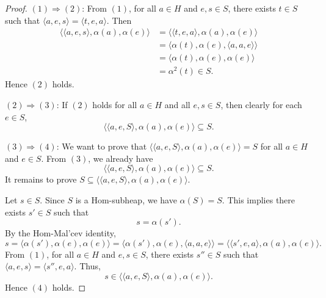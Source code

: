 \documentclass[14pt]{article}
\theoremstyle{Definition}
\theoremstyle{remark}
\begin{document}
\begin{proof}
$(1) \Rightarrow (2)$:  
From $(1)$, for all $a \in H$ and $e, s \in S$, there exists $t \in S$ such that $\langle a, e, s \rangle = \langle t, e, a \rangle$. Then
\begin{align*}
\langle \langle a, e, s \rangle, \alpha(a), \alpha(e) \rangle
&= \langle \langle t, e, a \rangle, \alpha(a), \alpha(e) \rangle \\
&= \langle \alpha(t), \alpha(e), \langle a, a, e \rangle \rangle \\
&= \langle \alpha(t), \alpha(e), \alpha(e) \rangle \\
&= \alpha^{2}(t) \in S.
\end{align*}
Hence $(2)$ holds.

\vspace{0.3em}
$(2) \Rightarrow (3)$:  
If $(2)$ holds for all $a \in H$ and all $e, s \in S$, then clearly for each $e \in S$,
\[
\langle \langle a, e, S \rangle, \alpha(a), \alpha(e) \rangle \subseteq S.
\]

\vspace{0.3em}
$(3) \Rightarrow (4)$:  
We want to prove that $\langle \langle a, e, S \rangle, \alpha(a), \alpha(e) \rangle = S$ for all $a \in H$ and $e \in S$.  
From $(3)$, we already have
\[
\langle \langle a, e, S \rangle, \alpha(a), \alpha(e) \rangle \subseteq S.
\]
It remains to prove $S \subseteq \langle \langle a, e, S \rangle, \alpha(a), \alpha(e) \rangle$.

Let $s \in S$. Since $S$ is a Hom-subheap, we have $\alpha(S)=S$. This implies there exists $s' \in S$ such that
\[
s = \alpha(s').
\]
By the Hom-Mal'cev identity,
\[
s = \langle \alpha(s'), \alpha(e), \alpha(e) \rangle
  = \langle \alpha(s'), \alpha(e), \langle a, a, e \rangle \rangle
  = \langle \langle s', e, a \rangle, \alpha(a), \alpha(e) \rangle.
\]
From $(1)$, for all $a \in H$ and $e, s \in S$, there exists $s'' \in S$ such that $\langle a, e, s \rangle = \langle s'', e, a \rangle$. Thus,
\[
s \in \langle \langle a, e, S \rangle, \alpha(a), \alpha(e) \rangle.
\]
Hence $(4)$ holds.


\end{proof}
\end{document}
